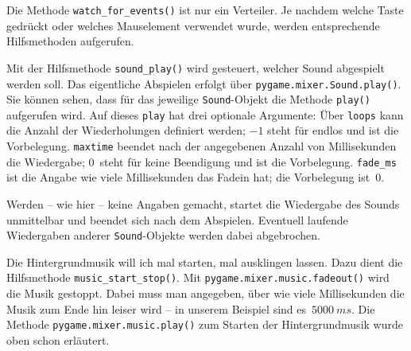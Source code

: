 
Die Methode \texttt{watch\_for\_events()} ist nur ein Verteiler. Je nachdem welche Taste gedrückt oder welches Mauselement verwendet wurde, werden entsprechende Hilfsmethoden aufgerufen.


Mit der Hilfsmethode \texttt{sound\_play()} wird gesteuert, welcher Sound abgespielt werden soll. Das eigentliche Abspielen erfolgt über \texttt{pygame.mixer.Sound.play()}. Sie können sehen, dass für das jeweilige \texttt{Sound}-Objekt die Methode \texttt{play()} aufgerufen wird. Auf dieses \texttt{play} hat drei optionale Argumente: Über \texttt{loops} kann die Anzahl der Wiederholungen definiert werden; $-1$ steht für endlos und ist die Vorbelegung. \texttt{maxtime} beendet nach der angegebenen Anzahl von Millisekunden die Wiedergabe; $0$~steht für keine Beendigung und ist die Vorbelegung. \texttt{fade\_ms} ist die Angabe wie viele Millisekunden das Fadein hat; die Vorbelegung ist~$0$.

Werden -- wie hier -- keine Angaben gemacht, startet die Wiedergabe des Sounds unmittelbar und beendet sich nach dem Abspielen. Eventuell laufende Wiedergaben anderer \texttt{Sound}-Objekte werden dabei abgebrochen.


Die Hintergrundmusik will ich mal starten, mal ausklingen lassen. Dazu dient die Hilfsmethode \texttt{music\_start\_stop()}. Mit  \texttt{pygame.mixer.music.fadeout()} wird die Musik gestoppt. Dabei muss man angegeben, über wie viele Millisekunden die Musik zum Ende hin leiser wird -- in unserem Beispiel sind es~$5000~ms$. Die Methode \texttt{pygame.mixer.music\-.play()} zum Starten der Hintergrundmusik wurde oben schon erläutert.


